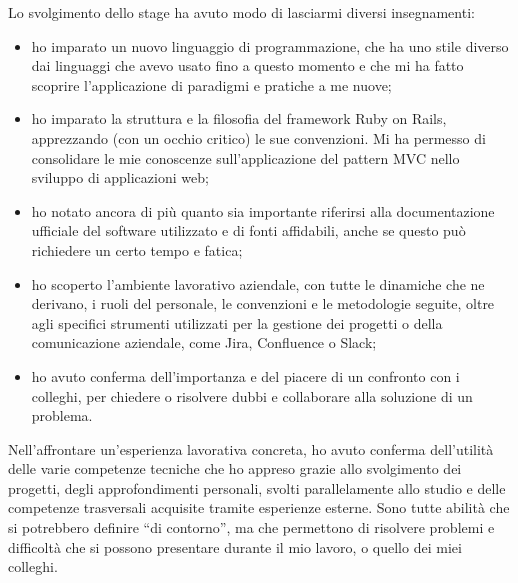 \noindent Lo svolgimento dello stage ha avuto modo di lasciarmi diversi insegnamenti:
\begin{itemize}
	\item ho imparato un nuovo linguaggio di programmazione, che ha uno stile diverso dai linguaggi che avevo usato fino a questo momento e che mi ha fatto scoprire l'applicazione di paradigmi e pratiche a me nuove;
	\item ho imparato la struttura e la filosofia del framework Ruby on Rails, apprezzando (con un occhio critico) le sue convenzioni. Mi ha permesso di consolidare le mie conoscenze sull'applicazione del pattern MVC nello sviluppo di applicazioni web;
	\item ho notato ancora di più quanto sia importante riferirsi alla documentazione ufficiale del software utilizzato e di fonti affidabili, anche se questo può richiedere un certo tempo e fatica;
	\item ho scoperto l'ambiente lavorativo aziendale, con tutte le dinamiche che ne derivano, i ruoli del personale, le convenzioni e le metodologie seguite, oltre agli specifici strumenti utilizzati per la gestione dei progetti o della comunicazione aziendale, come Jira, Confluence o Slack;
	\item ho avuto conferma dell'importanza e del piacere di un confronto con i colleghi, per chiedere o risolvere dubbi e collaborare alla soluzione di un problema.
\end{itemize}

\noindent Nell'affrontare un'esperienza lavorativa concreta, ho avuto conferma dell'utilità delle varie competenze tecniche che ho appreso grazie allo svolgimento dei progetti, degli approfondimenti personali, svolti parallelamente allo studio e delle competenze trasversali acquisite tramite esperienze esterne. Sono tutte abilità che si potrebbero definire ``di contorno'', ma che permettono di risolvere problemi e difficoltà che si possono presentare durante il mio lavoro, o quello dei miei colleghi.
